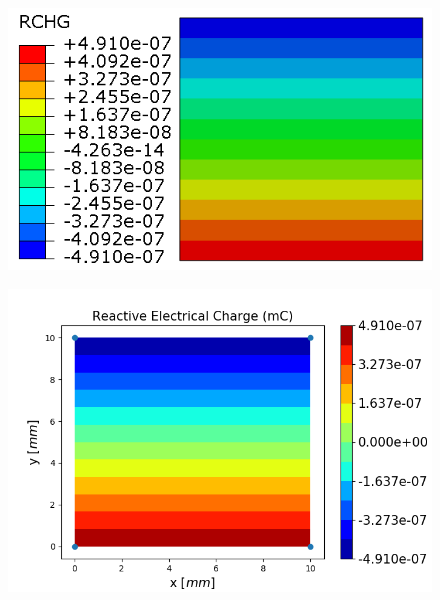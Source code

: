 \documentclass[12pt]{article}
\begin{document}
\begin{figure}[H]
	\centering
	\begin{minipage}{.5\textwidth}
		\centering
		\includegraphics[width=1\linewidth]{E1RCHG.png}
		\label{E1RCHG}
	\end{minipage}%
	\begin{minipage}{.6\textwidth}
		\centering
		\includegraphics[width=1\linewidth]{E1RCHG_IGA.png}
		\label{E1RCHG_IGA}
	\end{minipage}
\end{figure}
\end{document}
